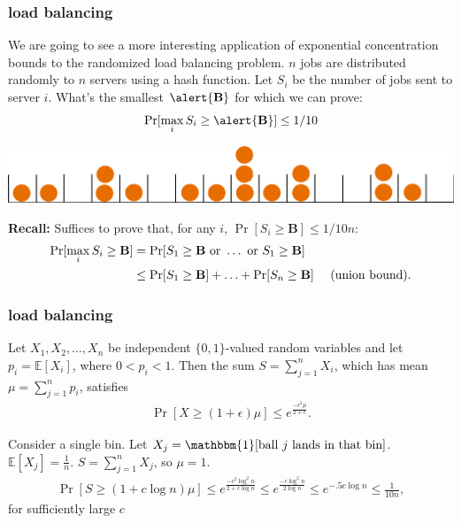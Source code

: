 \documentclass[compress]{beamer}
\newcommand{\E}{\mathbb{E}}
\begin{document}
\begin{frame}
	\frametitle{load balancing}
	\small
	We are going to see a more interesting application of exponential concentration bounds to the randomized load balancing problem. $n$ jobs are distributed randomly to $n$ servers using a hash function. Let $S_i$ be the number of jobs sent to server $i$.  What's the smallest $\alert{\mathbf{B}}$ for which we can prove:
	\begin{align*}
		\Pr[\max_i S_i \geq \alert{\mathbf{B}}] \leq 1/10
	\end{align*}
	\vspace{-1em}
	\begin{center}
		\includegraphics[width=.6\textwidth]{ballsinbins.png}
	\end{center}
	
	\textbf{Recall:} Suffices to prove that, for any $i$, $\Pr[ S_i \geq {\mathbf{B}}] \leq 1/10n$:
	\begin{align*}
		\Pr[\max_i S_i \geq {\mathbf{B}}] &= \Pr[S_1 \geq {\mathbf{B}} \text{ or } \ldots \text{ or } S_1 \geq {\mathbf{B}}] \\
		&\leq \Pr[S_1 \geq {\mathbf{B}}] + \ldots + \Pr[S_n \geq {\mathbf{B}}] \text{\hspace{1em} (union bound)}.
	\end{align*}
\end{frame}

\begin{frame}[t]
	\frametitle{load balancing}
	\begin{theorem}
		Let $X_1,X_2,\ldots,X_n$ be independent $\{0,1\}$-valued random variables and let
		$p_i = \E[X_i]$, where $0<p_i<1$.
		Then the sum $S = \sum_{j=1}^{n} X_i$, which has mean
		$\mu = \sum_{j=1}^{n} p_i$, satisfies
		\begin{align*}
			\Pr[X \geq (1+\epsilon)\mu] \leq e^{\frac{-\epsilon^2\mu}{2+ \epsilon}}.
		\end{align*}
	\end{theorem} 
	Consider a single bin. Let $X_j = \mathbbm{1}[\text{ball $j$ lands in that bin}]$. $\E[X_j] = \frac{1}{n}$. $S = \sum_{j=1}^n X_j$, so $\mu = 1$. 
	\begin{align*}
		\Pr[S \geq (1+c\log n)\mu] \leq e^{\frac{-c^2\log^2 n}{2 + c\log n}} \leq e^{\frac{-c\log^2 n}{2\log n}} \leq e^{-.5c\log n} \leq \frac{1}{10n},
	\end{align*}
	for sufficiently large $c$
	
\end{frame}
\end{document}
